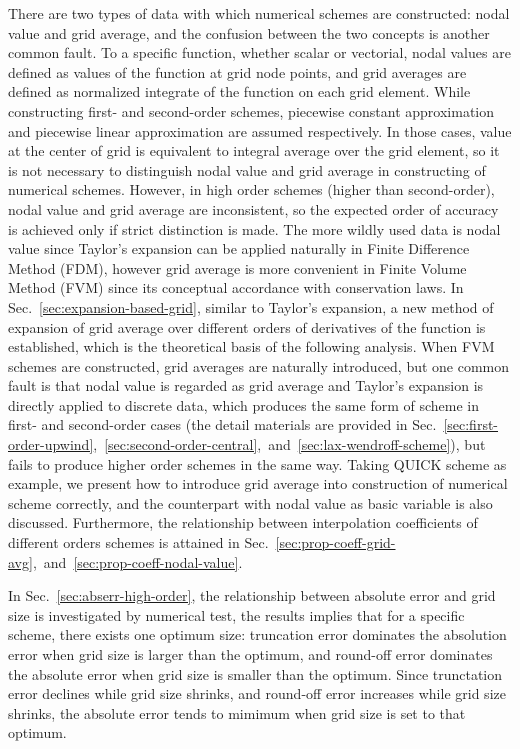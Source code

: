 \documentclass[]{article}
\begin{document}
There are two types of data with which numerical schemes are constructed: nodal
value and grid average, and the confusion between the two concepts is another
common fault. To a specific function, whether scalar or vectorial,
nodal values are defined as values of the function at grid node points,
and grid averages are defined as normalized integrate of the function on each
grid element.
While constructing first- and second-order schemes, piecewise constant
approximation and piecewise linear approximation are assumed respectively.
In those cases, value at the center of grid is equivalent to integral average 
over the grid element, so it is not necessary to distinguish nodal value and grid
average in constructing of numerical schemes. However, in high order schemes
(higher than second-order), nodal value and grid average are inconsistent,
so the expected order of accuracy is achieved only if strict distinction is made.
The more wildly used data is nodal value since Taylor's
expansion can be applied naturally in Finite Difference Method (FDM), however
grid average is more convenient in Finite Volume Method (FVM) since its
conceptual accordance with conservation laws. 
In Sec.~\ref{sec:expansion-based-grid}, similar to Taylor's expansion, a new
method of expansion of grid average over different orders of derivatives of the
function is established, which is the theoretical basis of the following
analysis. 
When FVM schemes are constructed, grid averages are naturally introduced, but 
one common fault is that nodal value is regarded as grid
average and Taylor's expansion is directly applied to discrete data, 
which produces the same form of scheme in first- and
second-order cases (the detail materials are provided in 
Sec.~\ref{sec:first-order-upwind},~\ref{sec:second-order-central},~and~\ref{sec:lax-wendroff-scheme}),
but fails to produce higher order
schemes in the same way. Taking QUICK scheme as example, we present how to
introduce grid average into
construction of numerical scheme correctly, and the counterpart with nodal value
as basic variable is also discussed.
Furthermore, the relationship between interpolation
coefficients of different orders schemes is attained in
Sec.~\ref{sec:prop-coeff-grid-avg},~and~\ref{sec:prop-coeff-nodal-value}.

In Sec.~\ref{sec:abserr-high-order}, the relationship between
absolute error and grid size is investigated by numerical test, the results
implies that for a specific scheme, there exists one optimum size:
truncation error dominates the absolution error when grid size is larger
than the optimum, and round-off error dominates the absolute error when
grid size is smaller than the optimum. Since trunctation error declines while
grid size shrinks, and round-off error increases while grid size shrinks, the
absolute error tends to mimimum when grid size is set to that optimum.
\end{document}
